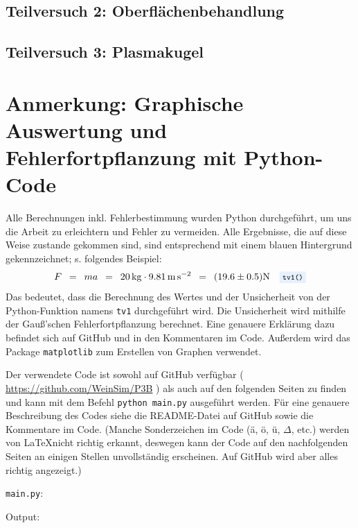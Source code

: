 \documentclass{article}
\newcommand{\widespace}{\enspace}
\newcommand{\wideeq}{\widespace = \widespace}
\newcommand{\coderef}[1]{%
    \text{\footnotesize \colorbox{codebg}{\texttt{#1()}}}%
}
\newcommand{\githuburl}{
    \url{https://github.com/WeinSim/P3B}
}
\begin{document}
\newpage

\subsection{Teilversuch 2: Oberflächenbehandlung}


\newpage

\subsection{Teilversuch 3: Plasmakugel}


\newpage

\section{Anmerkung: Graphische Auswertung und Fehlerfortpflanzung mit Python-Code}

Alle Berechnungen inkl. Fehlerbestimmung wurden Python durchgeführt, um uns die Arbeit
zu erleichtern und Fehler zu vermeiden.
Alle Ergebnisse, die auf diese Weise zustande gekommen sind,
sind entsprechend mit einem \colorbox{codebg}{blauen Hintergrund} gekennzeichnet;
s. folgendes Beispiel:
\[
    F \wideeq ma \wideeq \qty{20}{\kg} \cdot \qty{9.81}{\meter\per\square\second}
    \wideeq (\num{19.6} \pm \num{0,5}) \unit{\N} \quad \coderef{tv1}
\]
Das bedeutet, dass die Berechnung des Wertes und der Unsicherheit von der
Python-Funktion namens \verb|tv1| durchgeführt wird.
Die Unsicherheit wird mithilfe der Gauß'schen Fehlerfortpflanzung berechnet.
Eine genauere Erklärung dazu befindet sich auf GitHub und in den Kommentaren im Code.
Außerdem wird das Package \texttt{matplotlib} zum Erstellen
von Graphen verwendet.

Der verwendete Code ist sowohl auf GitHub verfügbar (\githuburl) als auch auf den
folgenden Seiten zu finden und kann mit dem Befehl \texttt{python main.py}
ausgeführt werden. Für eine genauere Beschreibung des Codes siehe die README-Datei
auf GitHub sowie die Kommentare im Code.
(Manche Sonderzeichen im Code (ä, ö, ü, $\Delta$, etc.) werden von \LaTeX nicht
richtig erkannt, deswegen kann der Code auf den nachfolgenden Seiten an einigen
Stellen unvollständig erscheinen. Auf GitHub wird aber alles richtig angezeigt.)

\newpage


\verb|main.py|:

\newpage

% 

Output:

\end{document}
